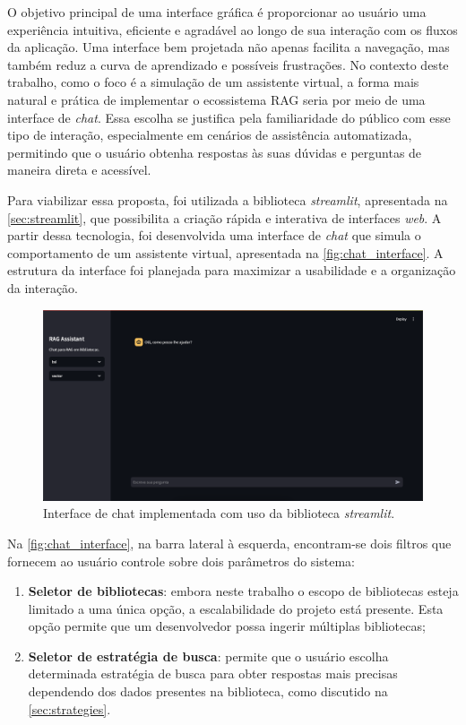 \documentclass[a4paper, 12pt]{article}
\begin{document}
    O objetivo principal de uma interface gráfica é proporcionar ao usuário uma experiência intuitiva, eficiente e agradável ao longo de sua interação com os fluxos da aplicação. Uma interface bem projetada não apenas facilita a navegação, mas também reduz a curva de aprendizado e possíveis frustrações. No contexto deste trabalho, como o foco é a simulação de um assistente virtual, a forma mais natural e prática de implementar o ecossistema RAG seria por meio de uma interface de \textit{chat}. Essa escolha se justifica pela familiaridade do público com esse tipo de interação, especialmente em cenários de assistência automatizada, permitindo que o usuário obtenha respostas às suas dúvidas e perguntas de maneira direta e acessível.

    Para viabilizar essa proposta, foi utilizada a biblioteca \textit{streamlit}, apresentada na \autoref{sec:streamlit}, que possibilita a criação rápida e interativa de interfaces \textit{web}. A partir dessa tecnologia, foi desenvolvida uma interface de \textit{chat} que simula o comportamento de um assistente virtual, apresentada na \autoref{fig:chat_interface}. A estrutura da interface foi planejada para maximizar a usabilidade e a organização da interação.
    
    \begin{figure}[ht]
        \includegraphics[width=\textwidth,height=0.9\textheight,keepaspectratio]{chat-interface.png}
        \centering
        \caption{Interface de chat implementada com uso da biblioteca \textit{streamlit}.}
        \centering
        \label{fig:chat_interface}
    \end{figure}

    Na \autoref{fig:chat_interface}, na barra lateral à esquerda, encontram-se dois filtros que fornecem ao usuário controle sobre dois parâmetros do sistema: 
    
    \begin{enumerate}
        \item \textbf{Seletor de bibliotecas}: embora neste trabalho o escopo de bibliotecas esteja limitado a uma única opção, a escalabilidade do projeto está presente. Esta opção permite que um desenvolvedor possa ingerir múltiplas bibliotecas;
        \item \textbf{Seletor de estratégia de busca}: permite que o usuário escolha determinada estratégia de busca para obter respostas mais precisas dependendo dos dados presentes na biblioteca, como discutido na \autoref{sec:strategies}.
    \end{enumerate}
    
\end{document}
